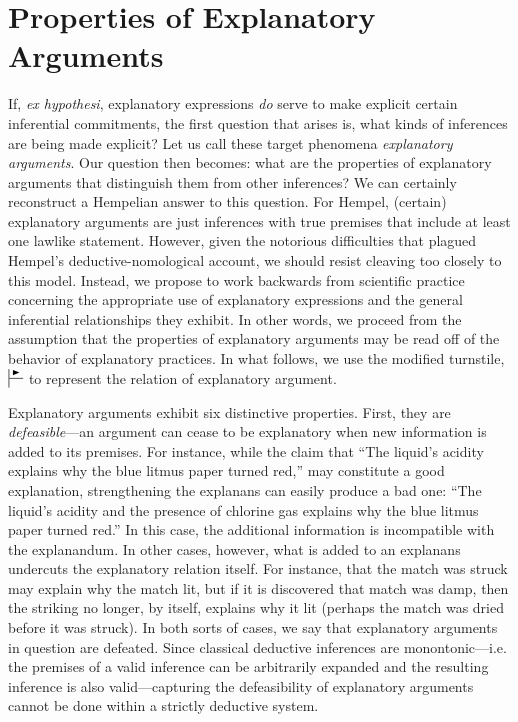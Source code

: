 \documentclass{article}
\theoremstyle{definition}
\theoremstyle{definition}
\theoremstyle{definition}
\theoremstyle{definition}
\theoremstyle{remark}
\theoremstyle{definition}
\theoremstyle{definition}
\begin{document}
\section{Properties of Explanatory Arguments}

If, \textit{ex hypothesi}, explanatory expressions \textit{do} serve to make explicit certain inferential commitments, the first question that arises is, what kinds of inferences are being made explicit? Let us call these target phenomena \textit{explanatory arguments}. Our question then becomes: what are the properties of explanatory arguments that distinguish them from other inferences? We can certainly reconstruct a Hempelian answer to this question. For Hempel, (certain) explanatory arguments are just inferences with true premises that include at least one lawlike statement. However, given the notorious difficulties that plagued Hempel's deductive-nomological account, we should resist cleaving too closely to this model. Instead, we propose to work backwards from scientific practice concerning the appropriate use of explanatory expressions and the general inferential relationships they exhibit. In other words, we proceed from the assumption that the properties of explanatory arguments may be read off of the behavior of explanatory practices. In what follows, we use the modified turnstile, $ \sststile{}{\RHD} $ to represent the relation of explanatory argument.


Explanatory arguments exhibit six distinctive properties. First, they are \textit{defeasible}---an argument can cease to be explanatory when new information is added to its premises. For instance, while the claim that ``The liquid's acidity explains why the blue litmus paper turned red,''  may constitute a good explanation, strengthening the explanans can easily produce a bad one: ``The liquid's acidity and the presence of chlorine gas explains why the blue litmus paper turned red.'' In this case, the additional information is incompatible with the explanandum. In other cases, however, what is added to an explanans undercuts the explanatory relation itself. For instance, that the match was struck may explain why the match lit, but if it is discovered that match was damp, then the striking no longer, by itself, explains why it lit (perhaps the match was dried before it was struck). In both sorts of cases, we say that explanatory arguments in question are defeated. Since classical deductive inferences are monontonic---i.e. the premises of a valid inference can be arbitrarily expanded and the resulting inference is also valid---capturing the defeasibility of explanatory arguments cannot be done within a strictly deductive system.
\end{document}
